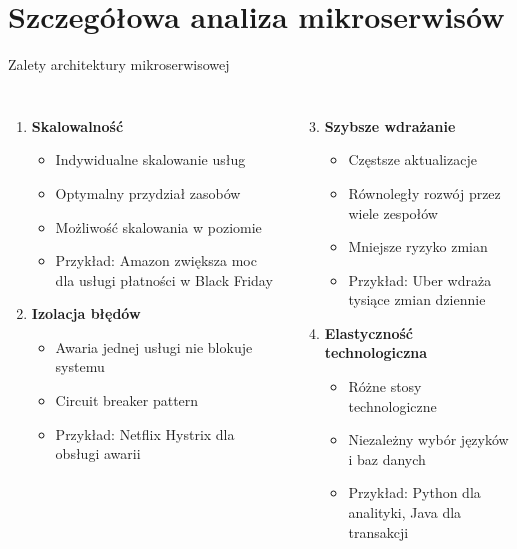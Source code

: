 \documentclass[aspectratio=169,xcolor=table]{beamer}
\begin{document}
\section{Szczegółowa analiza mikroserwisów}

\begin{frame}{Zalety architektury mikroserwisowej}
  \begin{columns}
    \begin{enumerate}
      \item \textbf{Skalowalność}
        \begin{itemize}
          \item Indywidualne skalowanie usług
          \item Optymalny przydział zasobów
          \item Możliwość skalowania w poziomie
          \item Przykład: Amazon zwiększa moc dla usługi płatności w Black Friday
        \end{itemize}
      
      \item \textbf{Izolacja błędów}
        \begin{itemize}
          \item Awaria jednej usługi nie blokuje systemu
          \item Circuit breaker pattern
          \item Przykład: Netflix Hystrix dla obsługi awarii
        \end{itemize}
    \end{enumerate}
    
    \begin{enumerate}\setcounter{enumi}{2}
      \item \textbf{Szybsze wdrażanie}
        \begin{itemize}
          \item Częstsze aktualizacje
          \item Równoległy rozwój przez wiele zespołów
          \item Mniejsze ryzyko zmian
          \item Przykład: Uber wdraża tysiące zmian dziennie
        \end{itemize}
        
      \item \textbf{Elastyczność technologiczna}
        \begin{itemize}
          \item Różne stosy technologiczne
          \item Niezależny wybór języków i baz danych
          \item Przykład: Python dla analityki, Java dla transakcji
        \end{itemize}
    \end{enumerate}
  \end{columns}
\end{frame}
\end{document}

